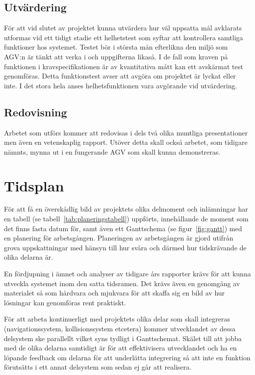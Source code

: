 \documentclass[a4paper,11pt]{article}
\begin{document}
\subsection{Utvärdering}
För att vid slutet av projektet kunna utvärdera hur väl uppsatta mål
avklarats utformas vid ett tidigt stadie ett helhetstest som syftar att
kontrollera samtliga funktioner hos systemet. Testet bör i största mån
efterlikna den miljö som AGV:n är tänkt att verka i och uppgifterna likaså.
I de fall som kraven på funktionen i kravspecifikationen är av kvantitativa
mått kan ett avskärmat test genomföras. Detta funktionstest avser att
avgöra om projektet är lyckat eller inte. I det stora hela anses
helhetsfunktionen vara avgörande vid utvärdering.


\subsection{Redovisning}
Arbetet som utförs kommer att redovisas i dels två olika muntliga
presentationer men även en vetenskaplig rapport. Utöver detta skall också
arbetet, som tidigare nämnts, mynna ut i en fungerande AGV som skall kunna
demonstreras.


\section{Tidsplan}
För att få en överskådlig bild av projektets olika delmoment och
inlämningar har en tabell (se tabell~\ref{tab:planeringstabell}) uppförts,
innehållande de moment som det finns fasta datum för, samt även ett
Ganttschema (se figur~\ref{fig:gantt}) med en planering för arbetsgången.
Planeringen av arbetsgången är gjord utifrån grova uppskattningar med
hänsyn till hur svåra och därmed hur tidskrävande de olika delarna är. 

En fördjupning i ämnet och analyser av tidigare års rapporter krävs för att
kunna utveckla systemet inom den satta tidsramen. Det krävs även en
genomgång av materialet så som hårdvara och mjukvara för att skaffa sig en
bild av hur lösningar kan genomföras rent praktiskt.

För att arbeta kontinuerligt med projektets olika delar som skall
integreras (navigationssystem, kollisionssystem etcetera) kommer
utvecklandet av dessa delsystem ske parallellt vilket syns tydligt i
Ganttschemat. Skälet till att jobba med de olika delarna samtidigt är för
att effektivisera utvecklandet och ha en löpande feedback om delarna för
att underlätta integrering så att inte en funktion förutsätts i ett annat
delsystem som sedan ej går att realisera.
\end{document}
